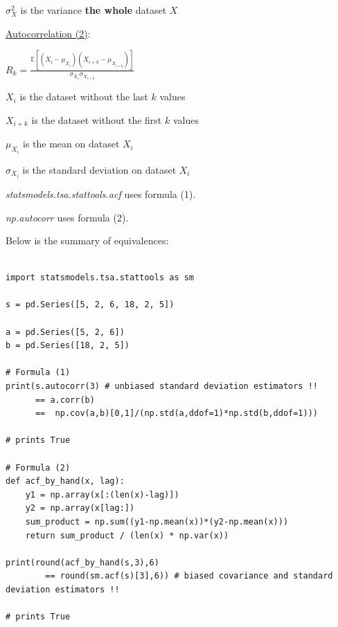 $\sigma_X^2$ is the variance \textbf{the whole} dataset $X$

\vspace{5mm}

\underline{Autocorrelation (2)}:

\begin{center}
$R_{k} = \frac{\mathbb{E}[(X_i-\mu_{X_i})(X_{i+k}-\mu_{X_{i+k}})]}{\sigma_{X_i}\sigma_{X_{i+k}}}$
\end{center}

$X_i$ is the dataset without the last $k$ values

$X_{i+k}$ is the dataset without the first $k$ values

$\mu_{X_i}$ is the mean on dataset $X_i$

$\sigma_{X_i}$ is the standard deviation on dataset $X_i$

\vspace{5mm}

\textit{statsmodels.tsa.stattools.acf} uses formula (1).

\textit{np.autocorr} uses formula (2).

Below is the summary of equivalences:

\lstset{language=Python}
\lstset{frame=lines}
\lstset{basicstyle=\footnotesize}
\begin{lstlisting}

import statsmodels.tsa.stattools as sm

s = pd.Series([5, 2, 6, 18, 2, 5])

a = pd.Series([5, 2, 6])
b = pd.Series([18, 2, 5])

# Formula (1)
print(s.autocorr(3) # unbiased standard deviation estimators !!
      == a.corr(b)
      ==  np.cov(a,b)[0,1]/(np.std(a,ddof=1)*np.std(b,ddof=1)))

# prints True

# Formula (2)
def acf_by_hand(x, lag):
    y1 = np.array(x[:(len(x)-lag)])
    y2 = np.array(x[lag:])
    sum_product = np.sum((y1-np.mean(x))*(y2-np.mean(x)))
    return sum_product / (len(x) * np.var(x))

print(round(acf_by_hand(s,3),6)
        == round(sm.acf(s)[3],6)) # biased covariance and standard deviation estimators !!

# prints True

\end{lstlisting}

\vspace{5mm}

